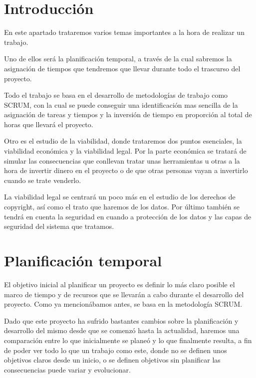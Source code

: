 
\section{Introducción}

En este apartado trataremos varios temas importantes a la hora de realizar un trabajo. 

Uno de ellos será la planificación temporal, a través de la cual sabremos la asignación de tiempos que tendremos que llevar durante todo el trascurso del proyecto.

Todo el trabajo se basa en el desarrollo de metodologías de trabajo como SCRUM, con la cual se puede conseguir una identificación mas sencilla de la asignación de tareas y tiempos y la inversión de tiempo en proporción al total de horas que llevará el proyecto.

Otro es el estudio de la viabilidad, donde trataremos dos puntos esenciales, la viabilidad económica y la viabilidad legal. Por la parte económica se tratará de simular las consecuencias que conllevan tratar unas herramientas u otras a la hora de invertir dinero en el proyecto o de que otras personas vayan a invertirlo cuando se trate venderlo.

La viabilidad legal se centrará un poco más en el estudio de los derechos de copyright, así como el trato que haremos de los datos. Por último también se tendrá en cuenta la seguridad en cuando a protección de los datos y las capas de seguridad del sistema que tratamos.

\section{Planificación temporal}

El objetivo inicial al planificar un proyecto es definir lo más claro posible el marco de tiempo y de recursos que se llevarán a cabo durante el desarrollo del proyecto. Como ya mencionábamos antes, se basa en la metodología SCRUM.

Dado que este proyecto ha sufrido bastantes cambios sobre la planificación y desarrollo del mismo desde que se comenzó hasta la actualidad, haremos una comparación entre lo que inicialmente se planeó y lo que finalmente resulta, a fin de poder ver todo lo que un trabajo como este, donde no se definen unos objetivos claros desde un inicio, o se definen objetivos sin planificar las consecuencias puede variar y evolucionar.

